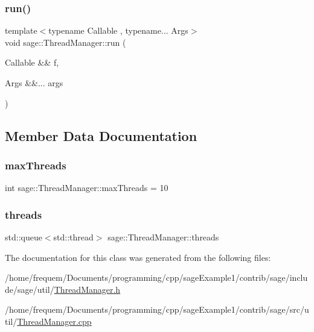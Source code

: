 \subsubsection{\texorpdfstring{run()}{run()}}
{\footnotesize\ttfamily template$<$typename Callable , typename... Args$>$ \\
void sage\+::\+Thread\+Manager\+::run (\begin{DoxyParamCaption}\item[{Callable \&\&}]{f,  }\item[{Args \&\&...}]{args }\end{DoxyParamCaption})}



\subsection{Member Data Documentation}
\mbox{\label{classsage_1_1ThreadManager_a683170f7241e11e86746d2a0aec413ed}} 
\subsubsection{\texorpdfstring{maxThreads}{maxThreads}}
{\footnotesize\ttfamily int sage\+::\+Thread\+Manager\+::max\+Threads = 10\hspace{0.3cm}{\ttfamily [private]}}

\mbox{\label{classsage_1_1ThreadManager_a998c3f4309c9eae2e7e69223b2d5de49}} 
\subsubsection{\texorpdfstring{threads}{threads}}
{\footnotesize\ttfamily std\+::queue$<$std\+::thread$>$ sage\+::\+Thread\+Manager\+::threads\hspace{0.3cm}{\ttfamily [private]}}



The documentation for this class was generated from the following files\+:\begin{DoxyCompactItemize}
\item 
/home/frequem/\+Documents/programming/cpp/sage\+Example1/contrib/sage/include/sage/util/\mbox{\hyperlink{ThreadManager_8h}{Thread\+Manager.\+h}}\item 
/home/frequem/\+Documents/programming/cpp/sage\+Example1/contrib/sage/src/util/\mbox{\hyperlink{ThreadManager_8cpp}{Thread\+Manager.\+cpp}}\end{DoxyCompactItemize}
